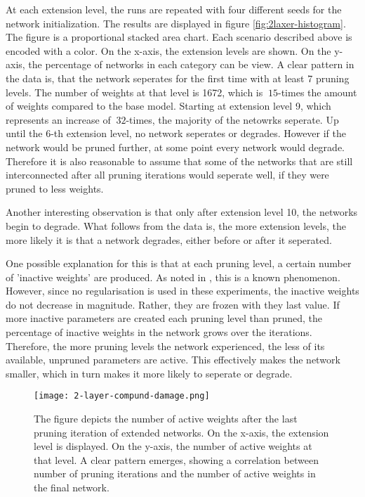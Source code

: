 At each extension level, the runs are repeated with four different seeds for the network initialization.
The results are displayed in figure \ref{fig:2laxer-histogram}.
The figure is a proportional stacked area chart.
Each scenario described above is encoded with a color.
On the x-axis, the extension levels are shown.
On the y-axis, the percentage of networks in each category can be view.
A clear pattern in the data is, that the network seperates for the first time with at least 7 pruning levels.
The number of weights at that level is 1672, which is $~15$-times the amount of weights compared to the base model. 
Starting at extension level 9, which represents an increase of $~32$-times, the majority of the netowrks seperate.
Up until the 6-th extension level, no network seperates or degrades. 
However if the network would be pruned further, at some point every network would degrade.
Therefore it is also reasonable to assume that some of the networks that are still interconnected after all pruning iterations would seperate well, if they were pruned to less weights.

Another interesting observation is that only after extension level 10, the networks begin to degrade.
What follows from the data is, the more extension levels, the more likely it is that a network degrades, either before or after it seperated.

One possible explanation for this is that at each pruning level, a certain number of 'inactive weights' are produced.
As noted in \autocite{HanEtAl15, AllAlivePruning}, this is a known phenomenon.
However, since no regularisation is used in these experiments, the inactive weights do not decrease in magnitude.
Rather, they are frozen with they last value.
If more inactive parameters are created each pruning level than pruned, the percentage of inactive weights in the network grows over the iterations.
Therefore, the more pruning levels the network experienced, the less of its available, unpruned parameters are active.
This effectively makes the network smaller, which in turn makes it more likely to seperate or degrade.

\begin{figure}[ht]
    \centering
    \texttt{[image: 2-layer-compund-damage.png]}
    \caption{
        The figure depicts the number of active weights after the last pruning iteration of extended networks.
        On the x-axis, the extension level is displayed.
        On the y-axis, the number of active weights at that level.
        A clear pattern emerges, showing a correlation between number of pruning iterations and the number of active weights in the final network.
    }
    \label{fig:collateral_damage}
\end{figure}

